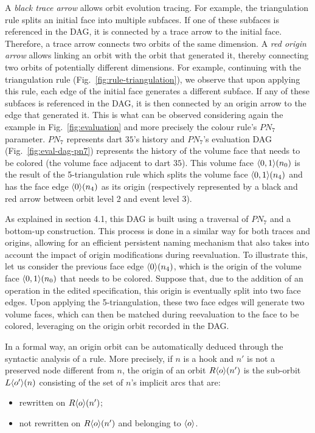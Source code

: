 A \emph{black trace arrow} allows orbit evolution tracing. %
For example, the triangulation rule splits an initial face into multiple
subfaces. %
If one of these subfaces is referenced in the DAG, it is connected by a trace
arrow to the initial face. %
Therefore, a trace arrow connects two orbits of the same dimension. %
A \emph{red origin arrow} allows linking an orbit with the orbit that generated
it, thereby connecting two orbits of potentially different dimensions. %
For example, continuing with the triangulation rule
(Fig.~\ref{fig:rule-triangulation}), we observe that upon applying this rule,
each edge of the initial face generates a different subface. %
If any of these subfaces is referenced in the DAG, it is then connected by an
origin arrow to the edge that generated it. %
This is what can be observed considering again the example in
Fig.~\ref{fig:evaluation} and more precisely the colour rule's $PN_7$
parameter. %
$PN_7$ represents dart $35$'s history and $PN_7$'s evaluation DAG
(Fig.~\ref{fig:eval-dag-pn7}) represents the history of the volume face that
needs to be colored (the volume face adjacent to dart $35$). %
This volume face $\langle0,1\rangle(n_0)$ is the result of the 5-triangulation rule
which splits the volume face $\langle0,1\rangle(n_4)$ and has the face edge
$\langle0\rangle(n_4)$ as its origin (respectively represented by a black and red
arrow between orbit level 2 and event level 3). %

As explained in section 4.1, this DAG is built using a  traversal of $PN_7$ and a bottom-up construction. This process is done in a similar way for both traces and origins, allowing for an efficient persistent naming mechanism that also takes into account the impact of origin modifications during reevaluation.
To illustrate this, let us consider the previous face edge $\langle0\rangle(n_4)$, which is the origin of the volume face $\langle0,1\rangle(n_0)$ that needs to be colored. Suppose that, due to the addition of an operation in the edited specification, this origin is eventually split into two face edges. Upon applying the 5-triangulation, these two face edges will generate two volume faces, which can then be matched during reevaluation to the face to be colored, leveraging on the  origin orbit recorded in the DAG.

In a formal way, an origin orbit can be automatically deduced through the syntactic analysis of a rule.
More precisely, if $n$ is a hook and $n'$ is not a preserved node different from $n$, the origin of an orbit $R\langle o\rangle(n')$ is the sub-orbit $L\langle o'\rangle(n)$ consisting of the set of $n$'s implicit arcs that are:
\begin{itemize}
    \item rewritten on $R\langle o\rangle(n')$;
    \item not rewritten on $R\langle o\rangle(n')$ and belonging to $\langle o\rangle$.
\end{itemize}

